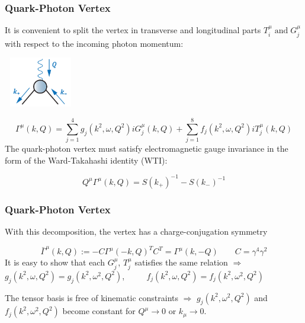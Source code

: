 \begin{frame}\frametitle{Quark-Photon Vertex}
\begin{minipage}[r]{0.65\textwidth}
	It is convenient to split the vertex in transverse and longitudinal parts $T_i^{\mu} \; \text{and} \; G_j^{\mu} $ with respect to the incoming photon momentum:
\end{minipage}
\begin{minipage}[r]{0.30\textwidth}
	\hspace{2mm}	
	\includegraphics[height=2.2cm, width=3.2cm]{Vertex.png}
\end{minipage}


\begin{equation}
	\Gamma^\mu(k,Q)=\sum_{j=1}^4 g_j(k^2, \omega, Q^2)iG^\mu_j(k, Q)+\sum_{j=1}^8 f_j(k^2, \omega, Q^2)iT^\mu_j(k, Q)
\end{equation}
The quark-photon vertex must satisfy electromagnetic gauge invariance in the form of the
Ward-Takahashi identity (WTI):

\begin{equation}
	Q^\mu\Gamma^\mu(k, Q)=S(k_+)^{-1}-S(k_-)^{-1}
\end{equation}

\end{frame}

\begin{frame}\frametitle{Quark-Photon Vertex}
With this decomposition, the vertex has a charge-conjugation symmetry

\begin{equation}
	\bar{\Gamma}^\mu(k,Q):=-C\Gamma^\mu(-k,Q)^TC^T=\Gamma^\mu(k, -Q) \qquad C=\gamma^4\gamma^2
\end{equation}
\vspace{4mm}
It is easy to show that each $G_j^\mu$, $T_j^\mu$
satisfies the same relation $\Rightarrow$\\ \vspace{3mm} $g_j(k^2, \omega, Q^2)=g_j(k^2, \omega^2, Q^2)$, $\qquad$ $f_j(k^2, \omega, Q^2)=f_j(k^2, \omega^2, Q^2)$\\

\vspace{9mm}

The tensor basis  is free of kinematic constraints $\Rightarrow$ 
\vspace{2mm}
$g_j(k^2, \omega^2,Q^2)$ and $f_j(k^2, \omega^2,Q^2)$ become constant for $Q^\mu\to0$ or $k_\mu\to  0$.

\end{frame}


\endinput
